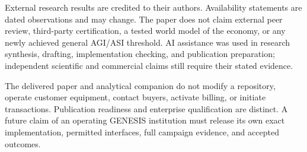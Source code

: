 \documentclass[11pt,letterpaper]{article}
\theoremstyle{remark}\newtheorem{remark}{Remark}[section]
\begin{document}
External research results are credited to their authors. Availability statements are dated observations and may change. The paper does not claim external peer review, third-party certification, a tested world model of the economy, or any newly achieved general AGI/ASI threshold. AI assistance was used in research synthesis, drafting, implementation checking, and publication preparation; independent scientific and commercial claims still require their stated evidence.

The delivered paper and analytical companion do not modify a repository, operate customer equipment, contact buyers, activate billing, or initiate transactions. Publication readiness and enterprise qualification are distinct. A future claim of an operating GENESIS institution must release its own exact implementation, permitted interfaces, full campaign evidence, and accepted outcomes.


\clearpage
\end{document}
